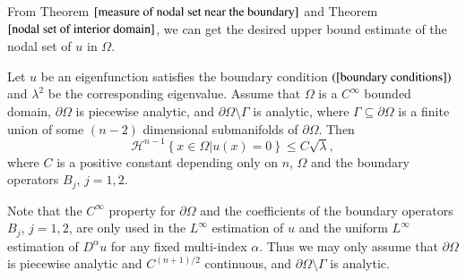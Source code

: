 \documentclass[a4paper, 12pt, onecolumn]{article} \textwidth 148mm
\begin{document}
From Theorem $\ref{measure of nodal set near the boundary}$ and Theorem $\ref{nodal set of interior domain}$, we can get the desired upper bound estimate of the nodal set of $u$ in $\Omega$.

\begin{theorem}\label{finally theorem}
Let $u$ be an eigenfunction satisfies the boundary condition $(\ref{boundary conditions})$ and $\lambda^2$ be the corresponding eigenvalue. Assume that $\Omega$ is a $C^{\infty}$ bounded domain, $\partial\Omega$ is piecewise analytic, and $\partial\Omega\setminus\Gamma$ is analytic, where  $\Gamma\subseteq\partial\Omega$ is a finite union of some $(n-2)$ dimensional submanifolds of $\partial\Omega$. Then
\begin{equation}
\mathcal{H}^{n-1}\left\{x\in\Omega|u(x)=0\right\}\leq C\sqrt{\lambda},
\end{equation}
where $C$ is a positive constant depending only on $n$, $\Omega$ and the boundary operators $B_j$, $j=1,2$.
\end{theorem}

\begin{remark}\label{condition weakend}
Note that the $C^{\infty}$ property for $\partial\Omega$ and the coefficients of the boundary operators $B_j$, $j=1,2$, are only used in the $L^{\infty}$ estimation of $u$ and the uniform $L^{\infty}$ estimation of $D^{\alpha}u$ for any fixed multi-index $\alpha$. Thus we may only assume that
$\partial\Omega$ is piecewise analytic and $C^{(n+1)/2}$ continuous, and $\partial\Omega\setminus\Gamma$ is analytic.
\end{remark}
\end{document}
